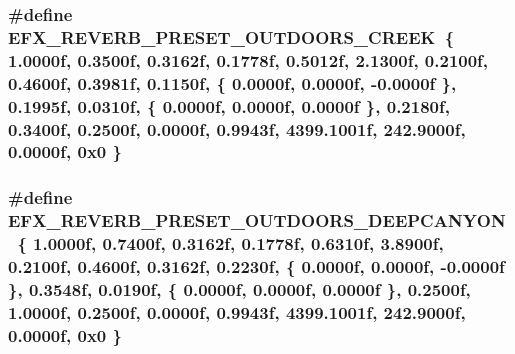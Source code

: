\subsubsection[{\texorpdfstring{E\+F\+X\+\_\+\+R\+E\+V\+E\+R\+B\+\_\+\+P\+R\+E\+S\+E\+T\+\_\+\+O\+U\+T\+D\+O\+O\+R\+S\+\_\+\+C\+R\+E\+EK}{EFX_REVERB_PRESET_OUTDOORS_CREEK}}]{\setlength{\rightskip}{0pt plus 5cm}\#define E\+F\+X\+\_\+\+R\+E\+V\+E\+R\+B\+\_\+\+P\+R\+E\+S\+E\+T\+\_\+\+O\+U\+T\+D\+O\+O\+R\+S\+\_\+\+C\+R\+E\+EK~\{ 1.\+0000f, 0.\+3500f, 0.\+3162f, 0.\+1778f, 0.\+5012f, 2.\+1300f, 0.\+2100f, 0.\+4600f, 0.\+3981f, 0.\+1150f, \{ 0.\+0000f, 0.\+0000f, -\/0.\+0000f \}, 0.\+1995f, 0.\+0310f, \{ 0.\+0000f, 0.\+0000f, 0.\+0000f \}, 0.\+2180f, 0.\+3400f, 0.\+2500f, 0.\+0000f, 0.\+9943f, 4399.\+1001f, 242.\+9000f, 0.\+0000f, 0x0 \}}\hypertarget{efx-presets_8h_a0f06675ed7b200e2681fa3a8ca33ea8e}{}\label{efx-presets_8h_a0f06675ed7b200e2681fa3a8ca33ea8e}
\subsubsection[{\texorpdfstring{E\+F\+X\+\_\+\+R\+E\+V\+E\+R\+B\+\_\+\+P\+R\+E\+S\+E\+T\+\_\+\+O\+U\+T\+D\+O\+O\+R\+S\+\_\+\+D\+E\+E\+P\+C\+A\+N\+Y\+ON}{EFX_REVERB_PRESET_OUTDOORS_DEEPCANYON}}]{\setlength{\rightskip}{0pt plus 5cm}\#define E\+F\+X\+\_\+\+R\+E\+V\+E\+R\+B\+\_\+\+P\+R\+E\+S\+E\+T\+\_\+\+O\+U\+T\+D\+O\+O\+R\+S\+\_\+\+D\+E\+E\+P\+C\+A\+N\+Y\+ON~\{ 1.\+0000f, 0.\+7400f, 0.\+3162f, 0.\+1778f, 0.\+6310f, 3.\+8900f, 0.\+2100f, 0.\+4600f, 0.\+3162f, 0.\+2230f, \{ 0.\+0000f, 0.\+0000f, -\/0.\+0000f \}, 0.\+3548f, 0.\+0190f, \{ 0.\+0000f, 0.\+0000f, 0.\+0000f \}, 0.\+2500f, 1.\+0000f, 0.\+2500f, 0.\+0000f, 0.\+9943f, 4399.\+1001f, 242.\+9000f, 0.\+0000f, 0x0 \}}\hypertarget{efx-presets_8h_a53c7c39adc1ee092ac71b0a5e4a30bb4}{}\label{efx-presets_8h_a53c7c39adc1ee092ac71b0a5e4a30bb4}
